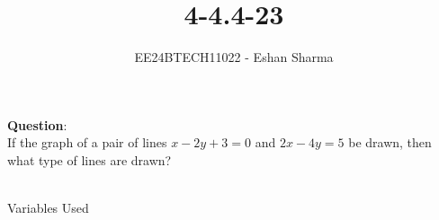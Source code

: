 \documentclass[journal]{IEEEtran}
\begin{document}

\vspace{3cm}

\title{4-4.4-23}
\author{EE24BTECH11022 - Eshan Sharma}
{\let\newpage\relax\maketitle}

\renewcommand{\thefigure}{\theenumi}
\renewcommand{\thetable}{\theenumi}
\setlength{\intextsep}{10pt} %


\renewcommand{\thetable}{\theenumi}

\textbf{Question}:\\
If the graph of a pair of lines $x-2y+3=0$ and $2x-4y=5$ be drawn, then what type of lines are drawn?
\\
\solution\\
\begin{table}[h!]    
  \centering
  
  \caption{Variables Used}
  \label{tab0}
\end{table}
\end{document}
